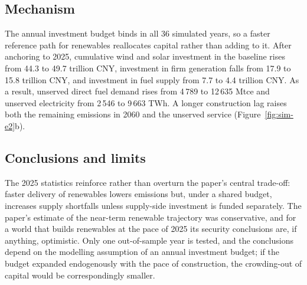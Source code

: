 \subsection{Mechanism}
The annual investment budget binds in all 36 simulated years, so a faster reference path for renewables reallocates capital rather than adding to it. After anchoring to 2025, cumulative wind and solar investment in the baseline rises from 44.3 to 49.7 trillion CNY, investment in firm generation falls from 17.9 to 15.8 trillion CNY, and investment in fuel supply from 7.7 to 4.4 trillion CNY. As a result, unserved direct fuel demand rises from 4\,789 to 12\,635 Mtce and unserved electricity from 2\,546 to 9\,663 TWh. A longer construction lag raises both the remaining emissions in 2060 and the unserved service (Figure~\ref{fig:sim-e2}b).

\subsection{Conclusions and limits}
The 2025 statistics reinforce rather than overturn the paper's central trade-off: faster delivery of renewables lowers emissions but, under a shared budget, increases supply shortfalls unless supply-side investment is funded separately. The paper's estimate of the near-term renewable trajectory was conservative, and for a world that builds renewables at the pace of 2025 its security conclusions are, if anything, optimistic. Only one out-of-sample year is tested, and the conclusions depend on the modelling assumption of an annual investment budget; if the budget expanded endogenously with the pace of construction, the crowding-out of capital would be correspondingly smaller.

